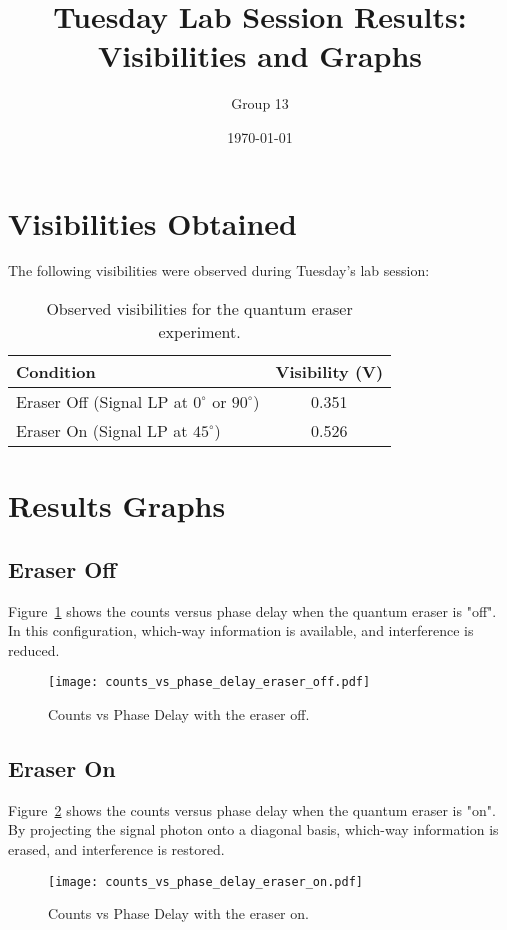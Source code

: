 \documentclass{article}
\title{Tuesday Lab Session Results: Visibilities and Graphs}
\author{Group 13} %
\date{\today}
\begin{document}
\maketitle
\pagestyle{empty} %

\section*{Visibilities Obtained}

The following visibilities were observed during Tuesday's lab session:

\begin{table}[h!]
\centering
\begin{tabular}{lc}
\toprule
\textbf{Condition} & \textbf{Visibility (V)} \\
\midrule
Eraser Off (Signal LP at $0^\circ$ or $90^\circ$) & 0.351 \\
Eraser On (Signal LP at $45^\circ$)          & 0.526 \\
\bottomrule
\end{tabular}
\caption{Observed visibilities for the quantum eraser experiment.}
\end{table}

\section*{Results Graphs}

\subsection*{Eraser Off}

Figure~\ref{fig:eraser_off} shows the counts versus phase delay when the quantum eraser is "off". In this configuration, which-way information is available, and interference is reduced.

\begin{figure}[h!]
\centering
\texttt{[image: counts\_vs\_phase\_delay\_eraser\_off.pdf]}
\caption{Counts vs Phase Delay with the eraser off.}
\label{fig:eraser_off}
\end{figure}

\subsection*{Eraser On}

Figure~\ref{fig:eraser_on} shows the counts versus phase delay when the quantum eraser is "on". By projecting the signal photon onto a diagonal basis, which-way information is erased, and interference is restored.

\begin{figure}[h!]
\centering
\texttt{[image: counts\_vs\_phase\_delay\_eraser\_on.pdf]}
\caption{Counts vs Phase Delay with the eraser on.}
\label{fig:eraser_on}
\end{figure}
\end{document}
